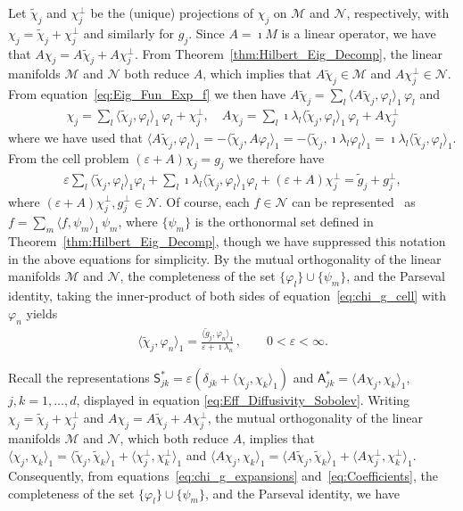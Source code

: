\documentclass[leqno,onefignum,onetabnum]{siamltex1213}
\newcommand{\thmref}[1]{Theorem~\ref{#1}}
\newcommand{\Mc}{\mathcal{M}}
\newcommand{\Nc}{\mathcal{N}}
\newcommand{\Sm}{\mathsf{S}}
\newcommand{\Am}{\mathsf{A}}
\newcommand{\chit}{\tilde{\chi}}
\newcommand{\gt}{\tilde{g}}
\begin{document}
Let $\chit_j$ and $\chi_j^\perp$ be the (unique) projections of $\chi_j$
on $\Mc$ and $\Nc$, respectively, with $\chi_j=\chit_j+\chi_j^\perp$ and
similarly for $g_j$. Since $A=\imath M$ is a linear operator, we have that
$A\chi_j=A\chit_j+A\chi_j^\perp$. From \thmref{thm:Hilbert_Eig_Decomp}, the
linear manifolds $\Mc$ and $\Nc$ both reduce $A$, which implies that
$A\chit_j\in\Mc$ and $A\chi_j^\perp\in\Nc$. From
equation~\eqref{eq:Eig_Fun_Exp_f} we then have
$A\chit_j=\sum_l\langle A\chit_j,\varphi_l\rangle_1\,\varphi_l$ and       
%
\begin{align}\label{eq:chi_g_expansions}
  \chi_j=\sum_l\langle\chit_j,\varphi_l\rangle_1\,\varphi_l +\chi_j^\perp,
  \quad
  A\chi_j=\sum_l\imath\lambda_l\langle\chit_j,\varphi_l\rangle_1\,\varphi_l +A\chi_j^\perp
\end{align}
%
where we have used that
$\langle A\chit_j,\varphi_l\rangle_1=-\langle\chit_j,A\varphi_l\rangle_1=-\langle\chit_j,\imath \lambda_l\varphi_l\rangle_1=\imath\lambda_l\langle\chit_j,\varphi_l\rangle_1$. From the
cell problem $(\varepsilon+A)\chi_j=g_j$ we therefore have
%
\begin{align}\label{eq:chi_g_cell}
  \varepsilon\sum_l\langle\chit_j,\varphi_l\rangle_1\varphi_l + \sum_l\imath\lambda_l\langle\chit_j,\varphi_l\rangle_1\varphi_l + (\varepsilon+A)\chi_j^\perp=\gt_j+g_j^\perp,
\end{align}
%
where $(\varepsilon+A)\chi_j^\perp,g_j^\perp\in\Nc$. Of course, each $f\in\Nc$ can be
represented~\cite{Stone:64} as $f=\sum_m\langle f,\psi_m\rangle_1\,\psi_m$, where $\{\psi_m\}$ is the
orthonormal set defined in \thmref{thm:Hilbert_Eig_Decomp}, though we
have suppressed this notation in the above equations for
simplicity. By the mutual orthogonality of the linear manifolds
$\Mc$ and $\Nc$, the completeness of the set $\{\varphi_l\}\cup\{\psi_m\}$, and the
Parseval identity, taking the inner-product of both sides of
equation~\eqref{eq:chi_g_cell} with $\varphi_n$ yields
%
\begin{align}\label{eq:Coefficients}
  \langle\chit_j,\varphi_n\rangle_1=\frac{\langle\gt_j,\varphi_n\rangle_1}{\varepsilon+\imath\lambda_n}\,,
  \qquad
  0<\varepsilon<\infty.
\end{align}
%




Recall the representations $\Sm^*_{jk}=\varepsilon(\delta_{jk}+\langle\chi_j,\chi_k\rangle_1)$ and
$\Am^*_{jk}=\langle A\chi_j,\chi_k\rangle_1$, $j,k=1,\ldots,d$, displayed in equation 
\eqref{eq:Eff_Diffusivity_Sobolev}. Writing $\chi_j=\chit_j+\chi_j^\perp$ and
$A\chi_j=A\chit_j+A\chi_j^\perp$, the mutual orthogonality of the linear
manifolds $\Mc$ and $\Nc$, which both reduce $A$, implies that
$\langle\chi_j,\chi_k\rangle_1=\langle\chit_j,\chit_k\rangle_1+\langle\chi^\perp_j,\chi^\perp_k\rangle_1$ and
$\langle A\chi_j,\chi_k\rangle_1=\langle A\chit_j,\chit_k\rangle_1+\langle A\chi^\perp_j,\chi^\perp_k\rangle_1$. Consequently,
from equations~\eqref{eq:chi_g_expansions}
and~\eqref{eq:Coefficients}, the completeness of the set
$\{\varphi_l\}\cup\{\psi_m\}$, and the Parseval identity, we have  
\end{document}
